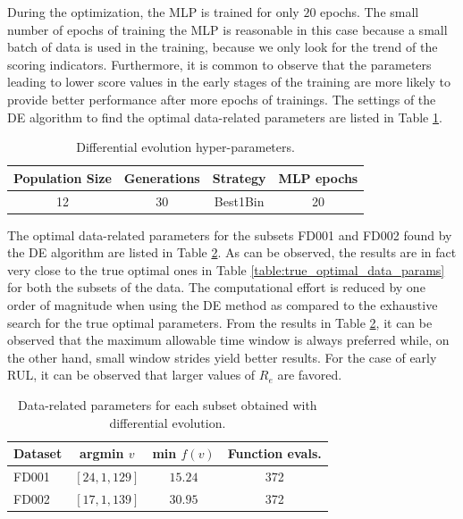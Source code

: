 \documentclass[preprint,12pt]{elsarticle}%
\begin{document}
During the optimization, the MLP is trained for only $20$ epochs. The small number
of epochs of training the MLP is reasonable in this case because a small batch
of data is used in the training, because we only look for the trend of the scoring indicators.
Furthermore, it is common to observe that the parameters leading to lower
score values in the early stages of the training are more likely to provide
better performance after more epochs of trainings. The settings of
the DE algorithm to find the optimal data-related parameters are listed in
Table \ref{table:de_hyperparams}.

\begin{table}[!htb]
\begin{center}
\begin{tabular}[c]{llll}\hline
Population Size & Generations & Strategy & MLP epochs\\\hline
\multicolumn{1}{c}{12} & \multicolumn{1}{c}{30} & \multicolumn{1}{c}{Best1Bin \cite{Engelbrecht2007}}
& \multicolumn{1}{c}{20}\\\hline
\end{tabular}
\caption{Differential evolution hyper-parameters.}
\label{table:de_hyperparams}
\end{center}
\end{table}

The optimal data-related parameters for the subsets FD001 and FD002 found by
the DE algorithm are listed in Table \ref{table:optimal_data_params}. As can be
observed, the results are in fact very close to the true optimal ones 
in Table \ref{table:true_optimal_data_params} for both the subsets of the
data. The computational effort is reduced by one order of magnitude when using
the DE method as compared to the exhaustive search for the true optimal
parameters. From the results in Table \ref{table:optimal_data_params}, it can
be observed that the maximum allowable time window is always preferred while,
on the other hand, small window strides yield better results. For the case of
early RUL, it can be observed that larger values of $R_{e}$ are favored.

\begin{table}[!htb]
\begin{center}
\begin{tabular}[c]{l|crr}\hline
Dataset & argmin $v$ & min $f(v)$ & Function evals.\\\hline
FD001 & $\left[  24,1,129\right]  $ & \multicolumn{1}{c}{$15.24$} & \multicolumn{1}{c}{372}\\
FD002 & $\left[  17,1,139\right]  $ & \multicolumn{1}{c}{$30.95$} & \multicolumn{1}{c}{372}\\\hline
\end{tabular}
\caption{Data-related parameters for each subset obtained with differential evolution.}
\label{table:optimal_data_params}
\end{center}
\end{table}
\end{document}
